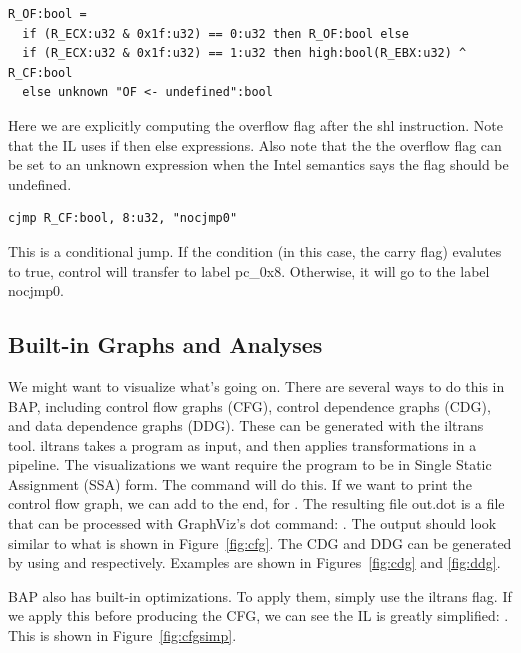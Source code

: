 \begin{verbatim}
R_OF:bool =
  if (R_ECX:u32 & 0x1f:u32) == 0:u32 then R_OF:bool else
  if (R_ECX:u32 & 0x1f:u32) == 1:u32 then high:bool(R_EBX:u32) ^ R_CF:bool
  else unknown "OF <- undefined":bool
\end{verbatim}
Here we are explicitly computing the overflow flag after the shl
instruction.  Note that the IL uses if then else expressions.  Also
note that the the overflow flag can be set to an unknown expression
when the Intel semantics says the flag should be undefined.

\begin{verbatim}
cjmp R_CF:bool, 8:u32, "nocjmp0"
\end{verbatim}
This is a conditional jump.  If the condition (in this case, the carry
flag) evalutes to true, control will transfer to label pc\_0x8.
Otherwise, it will go to the label nocjmp0.

\subsection{Built-in Graphs and Analyses}

We might want to visualize what's going on.  There are several ways to
do this in BAP, including control flow graphs (CFG), control
dependence graphs (CDG), and data dependence graphs (DDG).  These can
be generated with the iltrans tool.  iltrans takes a program as input,
and then applies transformations in a pipeline.  The visualizations we
want require the program to be in Single Static Assignment (SSA) form.
The command  will do this.  If
we want to print the control flow graph, we can add  to the end, for . The resulting file out.dot is a file that can be
processed with GraphViz's dot command: .  The output should look similar to what is shown in
Figure~\ref{fig:cfg}. The CDG and DDG can be generated by using
 and  respectively. Examples
are shown in Figures~\ref{fig:cdg} and \ref{fig:ddg}.

BAP also has built-in optimizations.  To apply them, simply use the
 iltrans flag.  If we apply this before producing
the CFG, we can see the IL is greatly simplified: . This is shown in
Figure~\ref{fig:cfgsimp}.

